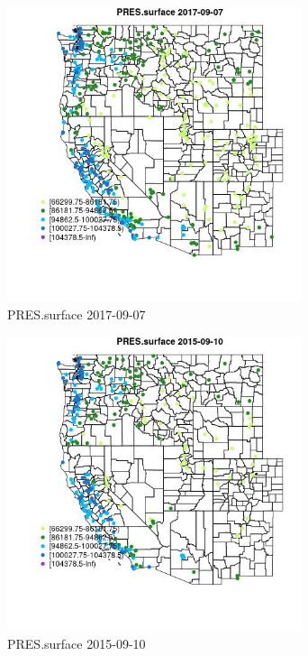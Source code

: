 \begin{figure} 
\centering  
\includegraphics[width=0.77\textwidth]{Code_Outputs/Report_ML_input_PM25_Step4_part_e_de_duplicated_aves_compiled_2019-05-20wNAs_MapObsPRESsurface2017-09-07.jpg} 
\caption{\label{fig:Report_ML_input_PM25_Step4_part_e_de_duplicated_aves_compiled_2019-05-20wNAsMapObsPRESsurface2017-09-07}PRES.surface 2017-09-07} 
\end{figure} 
 

\begin{figure} 
\centering  
\includegraphics[width=0.77\textwidth]{Code_Outputs/Report_ML_input_PM25_Step4_part_e_de_duplicated_aves_compiled_2019-05-20wNAs_MapObsPRESsurface2015-09-10.jpg} 
\caption{\label{fig:Report_ML_input_PM25_Step4_part_e_de_duplicated_aves_compiled_2019-05-20wNAsMapObsPRESsurface2015-09-10}PRES.surface 2015-09-10} 
\end{figure} 
 


